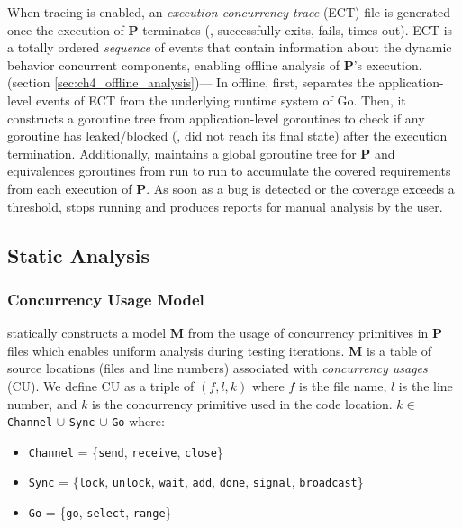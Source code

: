 %
When tracing is enabled, an \textit{execution concurrency trace} (ECT) file is generated once the execution of \textbf{P} terminates (\eg, successfully exits, fails, times out).
%
ECT is a totally ordered \textit{sequence} of events that contain information about the dynamic behavior concurrent components, enabling offline analysis of \textbf{P}'s execution.
\\
 (section \ref{sec:ch4_offline_analysis})---
In offline, \goat first, separates the application-level events of ECT from the underlying runtime system of Go.
%
Then, it constructs a goroutine tree from application-level goroutines to check if any goroutine has leaked/blocked (\ie, did not reach its final state) after the execution termination.
%
Additionally, \goat maintains a global goroutine tree for \textbf{P} and equivalences goroutines from run to run to accumulate the covered requirements from each execution of \textbf{P}.
%
As soon as a bug is detected or the coverage exceeds a threshold, \goat stops running and produces reports for manual analysis by the user.
%

\subsection{Static Analysis}
\label{sec:ch4_static_analysis}

\subsubsection{Concurrency Usage Model}
\goat statically constructs a model \textbf{M} from the usage of concurrency primitives in \textbf{P} files which enables uniform analysis during testing iterations.
%
\textbf{M} is a table of source locations (files and line numbers) associated with \textit{concurrency usages} (CU).
%
We define CU as a triple of $(f,l,k)$ where $f$ is the file name, $l$ is the line number, and $k$ is the concurrency primitive used in the code location.
$k\in$ \texttt{Channel} $\cup$ \texttt{Sync} $\cup$ \texttt{Go} where:
\begin{itemize}
  \item \texttt{Channel} = \{\texttt{send}, \texttt{receive}, \texttt{close}\}
  \item \texttt{Sync} = \{\texttt{lock}, \texttt{unlock}, \texttt{wait}, \texttt{add}, \texttt{done}, \texttt{signal}, \texttt{broadcast}\}
  \item \texttt{Go} = \{\texttt{go}, \texttt{select}, \texttt{range}\}
\end{itemize}

